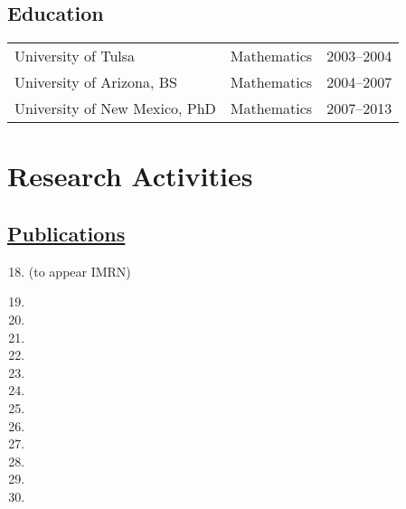 \documentclass[a4paper,10pt]{article}
\newenvironment{benumerate}[1]{
	\let\oldItem\item
	\def\item{\addtocounter{enumi}{-2}\oldItem}
	\begin{enumerate}
		\setcounter{enumi}{#1}
		\addtocounter{enumi}{1}
	}{
	\end{enumerate}
}
\begin{document}
 \subsection*{Education}
 \begin{flushleft}
\begin{tabular}{p{2in} p{1in}p{1in}}
University of Tulsa & Mathematics & 2003--2004 \\
University of Arizona, BS & Mathematics & 2004--2007\\
University of New Mexico, PhD &  Mathematics & 2007--2013
 \end{tabular}
 \end{flushleft}

\iffalse 
\subsection*{Research Interests}
Broad:  Algebraic Geometry, Differential Algebra, Number Theory, Applied Model Theory  \\
Specific: Deformation Theory, Diophantine Geometry, Differential Algebra and Witt vectors.
\fi 

\section*{Research Activities}

\subsection*{\href{https://arxiv.org/search/math?searchtype=author&query=Dupuy,+T}{Publications}}
\begin{benumerate}{17}
	\item {}  (to appear IMRN)
	\item {}
	\item  {} 
	\item  {}
	\item {}
	\item {}
	\item {}
	\item {}
	\item {}
	\item {}
	\item {}
	\item {}
	\item {}
\end{benumerate}
\end{document}
